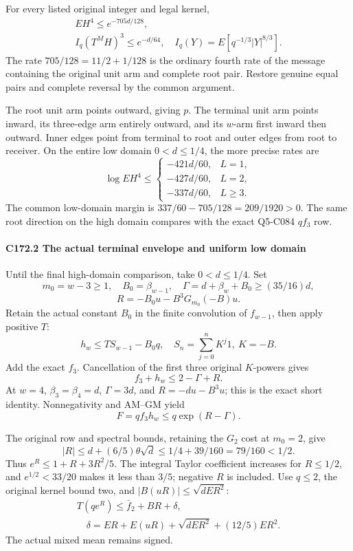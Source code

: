 For every listed original integer and legal kernel,
\[
\boxed{\begin{gathered}
EH^4\le e^{-705d/128},\qquad\\
I_q(T^MH)^3\le e^{-d/64},\quad I_q(Y)=E[q^{-1/3}|Y|^{8/3}].
\end{gathered}}\tag{C172.T179.2}
\]
The rate \(705/128=11/2+1/128\) is the ordinary fourth rate of the message containing the original unit arm and complete root pair. Restore genuine equal pairs and complete reversal by the common argument.

The root unit arm points outward, giving \(p\). The terminal unit arm points inward, its three-edge arm entirely outward, and its \(w\)-arm first inward then outward. Inner edges point from terminal to root and outer edges from root to receiver. On the entire low domain \(0<d\le1/4\), the more precise rates are
\[
\log EH^4\le\begin{cases}-421d/60,&L=1,\\-427d/60,&L=2,\\-337d/60,&L\ge3.\end{cases}            \tag{C172.T179.3}
\]
The common low-domain margin is \(337/60-705/128=209/1920>0\). The same root direction on the high domain compares with the exact Q5-C084 \(qf_3\) row.


\paragraph{C172.2 The actual terminal envelope and uniform low domain}

Until the final high-domain comparison, take \(0<d\le1/4\). Set
\[
m_0=w-3\ge1,\quad B_0=\beta_{w-1},\quad
\Gamma=d+\beta_w+B_0\ge(35/16)d,
\]
\[
R=-B_0u-B^3G_{m_0}(-B)u.                                \tag{C172.T179.8}
\]
Retain the actual constant \(B_0\) in the finite convolution of \(f_{w-1}\), then apply positive \(T\):
\[
h_w\le T S_{w-1}-B_0q,
\quad S_n=\sum_{j=0}^nK^j1,\ K=-B.
\]
Add the exact \(f_3\). Cancellation of the first three original \(K\)-powers gives
\[
f_3+h_w\le2-\Gamma+R.                                 \tag{C172.T179.9}
\]
At \(w=4\), \(\beta_3=\beta_4=d\), \(\Gamma=3d\), and \(R=-du-B^3u\); this is the exact short identity. Nonnegativity and AM--GM yield
\[
F=qf_3h_w\le q\exp(R-\Gamma).                          \tag{C172.T179.10}
\]

The original row and spectral bounds, retaining the \(G_2\) cost at \(m_0=2\), give
\[
|R|\le d+(6/5)\theta\sqrt d\le1/4+39/160=79/160<1/2.
\]
Thus \(e^R\le1+R+3R^2/5\). The integral Taylor coefficient increases for \(R\le1/2\), and \(e^{1/2}<33/20\) makes it less than \(3/5\); negative \(R\) is included. Use \(q\le2\), the original kernel bound two, and \(|B(uR)|\le\sqrt{dER^2}\):
\[
\begin{gathered}
T(qe^R)\le \bar f_2+BR+\delta,\\
\quad\delta=ER+E(uR)+\sqrt{dER^2}+(12/5)ER^2.
\end{gathered}\tag{C172.T179.11}
\]
The actual mixed mean remains signed.


